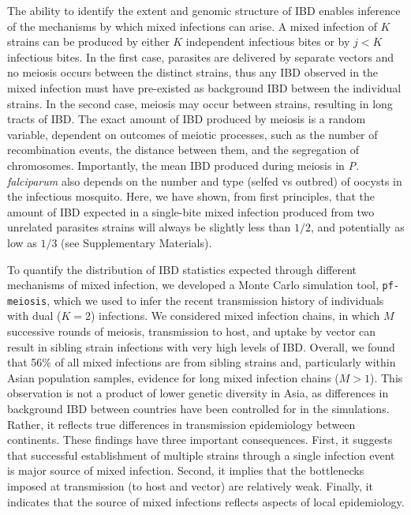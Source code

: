 \documentclass[9pt,lineno]{elife}
\begin{document}
The ability to identify the extent and genomic structure of IBD enables inference of the mechanisms by which mixed infections can arise.  A mixed infection of $K$ strains can be produced by either $K$ independent infectious bites or by $j < K$ infectious bites. In the first case, parasites are delivered by separate vectors and no meiosis occurs between the distinct strains, thus any IBD observed in the mixed infection must have pre-existed as background IBD between the individual strains.  In the second case, meiosis may occur between strains, resulting in long tracts of IBD.  The exact amount of IBD produced by meiosis is a random variable, dependent on outcomes of meiotic processes, such as the number of recombination events, the distance between them, and the segregation of chromosomes.  Importantly, the mean IBD produced during meiosis in \textit{P. falciparum} also depends on the number and type (selfed vs outbred) of oocysts in the infectious mosquito.  Here, we have shown, from first principles, that the amount of IBD expected in a single-bite mixed infection produced from two unrelated parasites strains will always be slightly less than $1/2$, and potentially as low as $1/3$ (see Supplementary Materials).

To quantify the distribution of IBD statistics expected through different mechanisms of mixed infection, we developed a Monte Carlo simulation tool, \texttt{pf-meiosis}, which we used to infer the recent transmission history of individuals with dual ($K=2$) infections.  We considered mixed infection chains, in which $M$ successive rounds of meiosis, transmission to host, and uptake by vector can result in sibling strain infections with very high levels of IBD.  Overall, we found that 56\% of all mixed infections are from sibling strains and, particularly within Asian population samples, evidence for long mixed infection chains ($M>1$).  This observation is not a product of lower genetic diversity in Asia, as differences in background IBD between countries have been controlled for in the simulations. Rather, it reflects true differences in transmission epidemiology between continents. These findings have three important consequences.  First, it suggests that successful establishment of multiple strains through a single infection event is major source of mixed infection.  Second, it implies that the bottlenecks imposed at transmission (to host and vector) are relatively weak.  Finally, it indicates that the source of mixed infections reflects aspects of local epidemiology.
\end{document}
